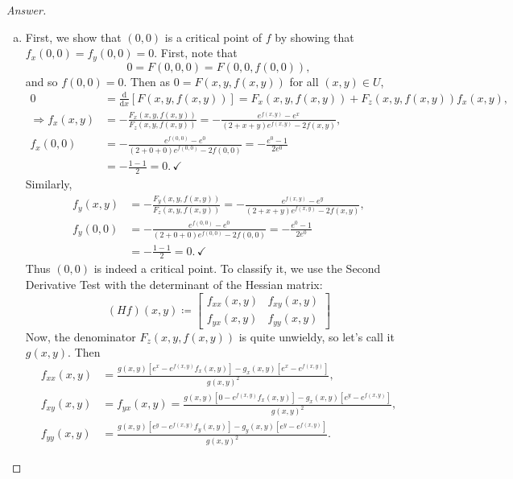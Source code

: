 \documentclass[12pt]{article}
\newcommand{\sqbrack}[1]{\left [ #1 \right ]}
\newcommand{\rd}{\mathrm{d}}
\theoremstyle{definition}
\begin{document}
\begin{proof}[Answer]
\begin{enumerate}[(a)]
        \item First, we show that $(0,0)$ is a critical point of $f$ by showing that $f_{x}(0,0) = f_{y}(0,0) = 0$. First, note that 
        \[
            0 = F(0,0,0) = F(0,0,f(0,0)) , 
        \]
        and so $f(0,0) = 0$. Then as $0 = F(x,y,f(x,y))$ for all $(x,y) \in U$, 
        \begin{align*}
            0 & = \frac{\rd}{\rd x} \sqbrack{ F(x,y,f(x,y)) } = F_{x}(x,y,f(x,y)) + F_{z}(x,y,f(x,y)) f_{x}(x,y) , \\ 
            \Rightarrow f_{x}(x,y) & = - \frac{ F_{x}(x,y,f(x,y)) }{ F_{z}(x,y,f(x,y)) } = -\frac{ e^{f(x,y)} - e^x }{ (2+x+y) e^{f(x,y)} - 2f(x,y) } , \\ 
            f_{x}(0,0) & = -\frac{ e^{f(0,0)} - e^0 }{ (2+0+0) e^{f(0,0)} - 2f(0,0) } = -\frac{ e^{0} - 1 }{ 2 e^{0} } \\ 
            & = -\frac{1-1}{2} = 0 . \, \checkmark 
        \end{align*}
        Similarly, 
        \begin{align*}
            f_{y}(x,y) & = - \frac{ F_{y}(x,y,f(x,y)) }{ F_{z}(x,y,f(x,y)) } = - \frac{ e^{f(x,y)} - e^y }{ (2+x+y) e^{f(x,y)} - 2f(x,y) } , \\ 
            f_{y}(0,0) & = -\frac{ e^{f(0,0)} - e^0 }{ (2+0+0) e^{f(0,0)} - 2f(0,0) } = -\frac{ e^{0} - 1 }{ 2 e^{0} } \\ 
            & = -\frac{1-1}{2} = 0 . \, \checkmark
        \end{align*}
        Thus $(0,0)$ is indeed a critical point. To classify it, we use the Second Derivative Test with the determinant of the Hessian matrix: 
        \[
            (Hf)(x,y) \coloneqq 
            \begin{bmatrix}
                f_{xx}(x,y) & f_{xy}(x,y) \\ 
                f_{yx}(x,y) & f_{yy}(x,y)
            \end{bmatrix}
        \]
        Now, the denominator $F_{z}(x,y,f(x,y))$ is quite unwieldy, so let's call it $g(x,y)$. Then 
        \begin{align*}
            f_{xx}(x,y) & = \frac{ g(x,y) \sqbrack{ e^x - e^{f(x,y)} f_{x}(x,y) } - g_{x}(x,y) \sqbrack{ e^{x} - e^{f(x,y)} } }{ g(x,y)^2 } , \\ 
            f_{xy}(x,y) & = f_{yx}(x,y) = \frac{ g(x,y) \sqbrack{ 0 - e^{f(x,y)} f_{x}(x,y) } - g_{x}(x,y) \sqbrack{ e^{y} - e^{f(x,y)} } }{ g(x,y)^2 } , \\ 
            f_{yy}(x,y) & = \frac{ g(x,y) \sqbrack{ e^y - e^{f(x,y)} f_{y}(x,y) } - g_{y}(x,y) \sqbrack{ e^{y} - e^{f(x,y)} } }{ g(x,y)^2 } . 

\end{align*}
\end{enumerate}
\end{proof}
\end{document}
